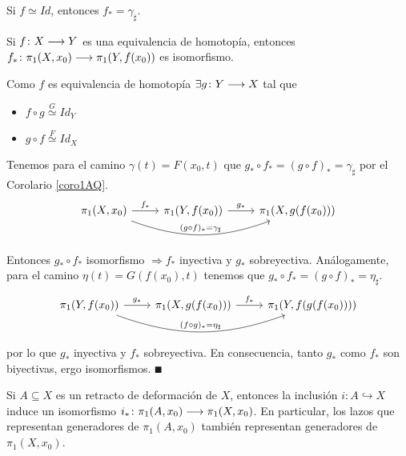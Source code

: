 \documentclass[GTS.tex]{subfiles}
\begin{document}
\begin{coro}\label{coro1AQ}
Si $f\simeq Id$, entonces $f_*=\gamma_\sharp$.
\end{coro}
\begin{coro}
Si $f\colon{X}\longrightarrow{Y}$ es una equivalencia de homotopía, entonces $f_*\colon{\pi_1(X,x_0)}\longrightarrow{\pi_1(Y,f(x_0))}$ es isomorfismo.
\end{coro}
\begin{dem}
Como $f$ es equivalencia de homotopía $\exists g\colon{Y}\longrightarrow{X}$ tal que
\begin{itemize}

\item $f\circ g\overset{G}{\simeq}Id_Y$
\item $g\circ f\overset{F}{\simeq}Id_X$
\end{itemize}
Tenemos para el camino $\gamma(t)=F(x_0,t)$ que $g_*\circ f_*=(g\circ f)_*=\gamma_\sharp$ por el Corolario \ref{coro1AQ}.
\[
\begin{tikzcd}
\pi_1(X,x_0)\arrow[r, "f_*"]\arrow[rr, "(g\circ f)_*=\gamma_\sharp", bend right=20] &  \pi_1(Y,f(x_0))\arrow[r,"g_*"] & \pi_1(X,g(f(x_0)))
\end{tikzcd}
\]

Entonces $g_*\circ f_*$ isomorfismo $\Rightarrow f_*$ inyectiva y $g_*$ sobreyectiva. Análogamente, para el camino $\eta(t)=G(f(x_0),t)$ tenemos que $g_*\circ f_*=(g\circ f)_*=\eta_\sharp$.
\[
\begin{tikzcd}
\pi_1(Y,f(x_0))\arrow[r, "g_*"]\arrow[rr, "(f\circ g)_*=\eta_\sharp", bend right=20] & \pi_1(X,g(f(x_0))) \arrow[r,"f_*"] & \pi_1(Y,f(g(f(x_0))))
\end{tikzcd}
\]
por lo que $g_*$ inyectiva y $f_*$ sobreyectiva. En consecuencia, tanto $g_*$ como $f_*$ son biyectivas, ergo isomorfismos. $\QED$

\end{dem}

\begin{coro}
Si $A\subseteq X$ es un retracto de deformación de $X$, entonces la inclusión $i:A\hookrightarrow X$ induce un isomorfismo $i_*\colon{\pi_1(A,x_0)}\longrightarrow{\pi_1(X,x_0)}$. En particular, los lazos que representan generadores de $\pi_1(A,x_0)$ también representan generadores de $\pi_1(X,x_0)$.
\end{coro}
\end{document}
